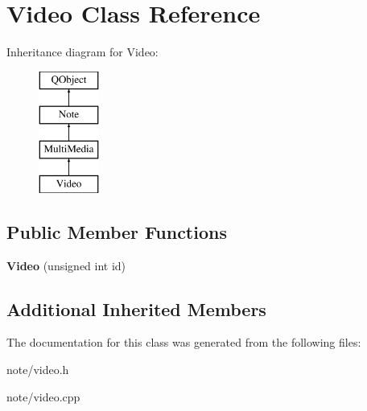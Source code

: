 \hypertarget{class_video}{\section{Video Class Reference}
\label{class_video}
}
Inheritance diagram for Video\-:\begin{figure}[H]
\begin{center}
\leavevmode
\includegraphics[height=4.000000cm]{class_video}
\end{center}
\end{figure}
\subsection*{Public Member Functions}
\begin{DoxyCompactItemize}
\item 
\hypertarget{class_video_aee8b4fd4ebfb466d7f5eef214b45608a}{{\bfseries Video} (unsigned int id)}\label{class_video_aee8b4fd4ebfb466d7f5eef214b45608a}

\end{DoxyCompactItemize}
\subsection*{Additional Inherited Members}


The documentation for this class was generated from the following files\-:\begin{DoxyCompactItemize}
\item 
note/video.\-h\item 
note/video.\-cpp\end{DoxyCompactItemize}
